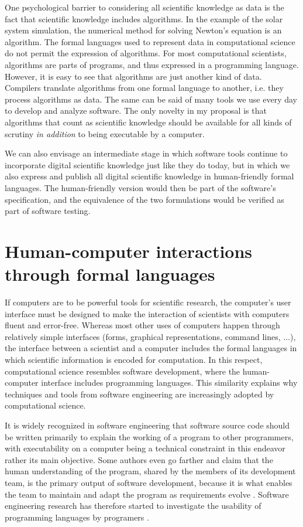 One psychological barrier to considering all scientific knowledge as data is the fact that scientific knowledge includes algorithms. In the example of the solar system simulation, the numerical method for solving Newton's equation is an algorithm. The formal languages used to represent data in computational science do not permit the expression of algorithms. For most computational scientists, algorithms are parts of programs, and thus expressed in a programming language. However, it is easy to see that algorithms are just another kind of data. Compilers translate algorithms from one formal language to another, i.e. they process algorithms as data. The same can be said of many tools we use every day to develop and analyze software. The only novelty in my proposal is that algorithms that count as scientific knowledge should be available for all kinds of scrutiny \textit{in addition} to being executable by a computer.

We can also envisage an intermediate stage in which software tools continue to incorporate digital scientific knowledge just like they do today, but in which we also express and publish all digital scientific knowledge in human-friendly formal languages. The human-friendly version would then be part of the software's specification, and the equivalence of the two formulations would be verified as part of software testing.

\section{Human-computer interactions through formal languages}
\label{HCI}

If computers are to be powerful tools for scientific research, the computer's user interface must be designed to make the interaction of scientists with computers fluent and error-free. Whereas most other uses of computers happen through relatively simple interfaces (forms, graphical representations, command lines, ...), the interface between a scientist and a computer includes the formal languages in which scientific information is encoded for computation. In this respect, computational science resembles software development, where the human-computer interface includes programming languages. This similarity explains why techniques and tools from software engineering are increasingly adopted by computational science.

It is widely recognized in software engineering that software source code should be written primarily to explain the working of a program to other programmers, with executability on a computer being a technical constraint in this endeavor rather its main objective. Some authors even go farther and claim that the human understanding of the program, shared by the members of its development team, is the primary output of software development, because it is what enables the team to maintain and adapt the program as requirements evolve \cite{naur_programming_1985}. Software engineering research has therefore started to investigate the usability of programming languages by programers \cite{_plateau_2010}.

